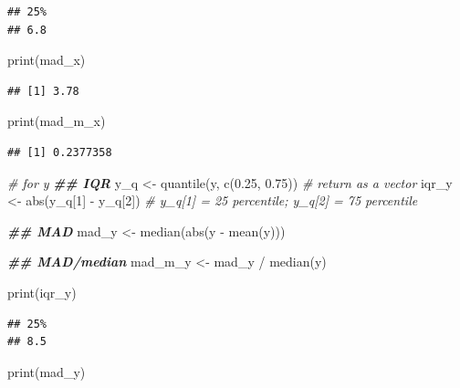 \documentclass[
]{article}
\newenvironment{Shaded}{\begin{snugshade}}{\end{snugshade}}
\newcommand{\CommentTok}[1]{\textcolor[rgb]{0.56,0.35,0.01}{\textit{#1}}}
\newcommand{\DecValTok}[1]{\textcolor[rgb]{0.00,0.00,0.81}{#1}}
\newcommand{\DocumentationTok}[1]{\textcolor[rgb]{0.56,0.35,0.01}{\textbf{\textit{#1}}}}
\newcommand{\FloatTok}[1]{\textcolor[rgb]{0.00,0.00,0.81}{#1}}
\newcommand{\FunctionTok}[1]{\textcolor[rgb]{0.00,0.00,0.00}{#1}}
\newcommand{\NormalTok}[1]{#1}
\newcommand{\OtherTok}[1]{\textcolor[rgb]{0.56,0.35,0.01}{#1}}
\newcommand{\SpecialCharTok}[1]{\textcolor[rgb]{0.00,0.00,0.00}{#1}}
\begin{document}
\begin{verbatim}
## 25% 
## 6.8
\end{verbatim}

\begin{Shaded}
\begin{Highlighting}[]
\FunctionTok{print}\NormalTok{(mad\_x)}
\end{Highlighting}
\end{Shaded}

\begin{verbatim}
## [1] 3.78
\end{verbatim}

\begin{Shaded}
\begin{Highlighting}[]
\FunctionTok{print}\NormalTok{(mad\_m\_x)}
\end{Highlighting}
\end{Shaded}

\begin{verbatim}
## [1] 0.2377358
\end{verbatim}

\begin{Shaded}
\begin{Highlighting}[]
\CommentTok{\# for y}
\DocumentationTok{\#\# IQR}
\NormalTok{y\_q }\OtherTok{\textless{}{-}} \FunctionTok{quantile}\NormalTok{(y, }\FunctionTok{c}\NormalTok{(}\FloatTok{0.25}\NormalTok{, }\FloatTok{0.75}\NormalTok{)) }\CommentTok{\# return as a vector}
\NormalTok{iqr\_y }\OtherTok{\textless{}{-}} \FunctionTok{abs}\NormalTok{(y\_q[}\DecValTok{1}\NormalTok{] }\SpecialCharTok{{-}}\NormalTok{ y\_q[}\DecValTok{2}\NormalTok{]) }\CommentTok{\# y\_q[1] = 25 percentile; y\_q[2] = 75 percentile}

\DocumentationTok{\#\# MAD}
\NormalTok{mad\_y }\OtherTok{\textless{}{-}} \FunctionTok{median}\NormalTok{(}\FunctionTok{abs}\NormalTok{(y }\SpecialCharTok{{-}} \FunctionTok{mean}\NormalTok{(y)))}

\DocumentationTok{\#\# MAD/median}
\NormalTok{mad\_m\_y }\OtherTok{\textless{}{-}}\NormalTok{ mad\_y }\SpecialCharTok{/} \FunctionTok{median}\NormalTok{(y)}

\FunctionTok{print}\NormalTok{(iqr\_y)}
\end{Highlighting}
\end{Shaded}

\begin{verbatim}
## 25% 
## 8.5
\end{verbatim}

\begin{Shaded}
\begin{Highlighting}[]
\FunctionTok{print}\NormalTok{(mad\_y)}
\end{Highlighting}
\end{Shaded}
\end{document}

